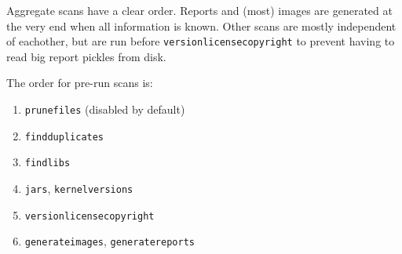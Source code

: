 \documentclass[10pt]{article}
\begin{document}
Aggregate scans have a clear order. Reports and (most) images are generated at
the very end when all information is known. Other scans are mostly independent
of eachother, but are run before \texttt{versionlicensecopyright} to prevent
having to read big report pickles from disk.

The order for pre-run scans is:

\begin{enumerate}
\item \texttt{prunefiles} (disabled by default)
\item \texttt{findduplicates}
\item \texttt{findlibs}
\item \texttt{jars}, \texttt{kernelversions}
\item \texttt{versionlicensecopyright}
\item \texttt{generateimages}, \texttt{generatereports}
\end{enumerate}
\end{document}
